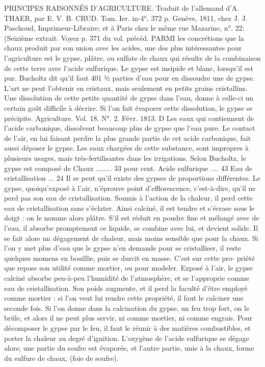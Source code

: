 \setcounter{page}{41} PRINCIPES RAISONNÉS D'AGRICULTURE. Traduit de l'allemand d'A. THAER, par E. V. B. CRUD. Tom. Ier. in-4°, 372 p. Genève, 1811, chez J. J. Paschoud, Imprimeur-Libraire; et à Paris chez le même rue Mazarine, n°. 22: (Seizième extrait. Voyez p. 371 du vol. précéd.
PARMI les concrétions que la chaux produit par son union avec les acides, une des plus intéressantes pour l'agriculture est le gypse, plâtre, ou sulfate de chaux qui résulte de la combinaison de cette terre avec l'acide sulfurique. Le gypse est insipide et blanc, lorsqu'il est pur. Bucholtz dit qu'il faut 401 ½ parties d'eau pour en dissoudre une de gypse. L'art ne peut l'obtenir en cristaux, mais seulement en petits grains cristallins.
Une dissolution de cette petite quantité de gypse dans l'eau, donne à celle-ci un certain goût difficile à décrire. Si l'on fait évaporer cette dissolution, le gypse se précipite.
Agriculture. Vol. 18. N°. 2. Févr. 1813. D\setcounter{page}{42} Les eaux qui contiennent de l'acide carbonique, dissolvent beaucoup plus de gypse que l'eau pure. Le contact de l'air, en lui faisant perdre la plus grande partie de cet acide carbonique, fait aussi déposer le gypse. Les eaux chargées de cette substance, sont impropres à plusieurs usages, mais très-fertilisantes dans les irrigations.
Selon Bucholtz, le gypse est composé de
Chaux ........ 33 pour cent.
Acide sulfurique .... 43
Eau de cristallisation ... 24
Il se peut qu'il existe des gypses de proportions différentes.
Le gypse, quoiqu'exposé à l'air, n'éprouve point d'efflorescence, c'est-à-dire, qu'il ne perd pas son eau de cristallisation. Soumis à l'action de la chaleur, il perd cette eau de cristallisation sans s'éclater. Ainsi calciné, il est tendre et s'écrase sous le doigt : on le nomme alors plâtre. S'il est réduit en poudre fine et mélangé avec de l'eau, il absorbe promptement ce liquide, se combine avec lui, et devient solide. Il se fait alors un dégagement de chaleur, mais moins sensible que pour la chaux. Si l'on y met plus d'eau que le gypse n'en demande pour se cristalliser, il reste quelques momens en bouillie, puis se durcit en masse. C'est sur cette pro-\setcounter{page}{43} priété que repose son utilité comme mortier, ou pour modeler.
Exposé à l'air, le gypse calciné absorbe peu-à-peu l'humidité de l'atmosphère, et se l'approprie comme eau de cristallisation. Son poids augmente, et il perd la faculté d'être employé comme mortier : si l'on veut lui rendre cette propriété, il faut le calciner une seconde fois.
Si l'on donne dans la calcination du gypse, un feu trop fort, on le brûle, et alors il ne peut plus servir, ni comme mortier, ni comme engrais. Pour décomposer le gypse par le feu, il faut le réunir à des matières combustibles, et porter la chaleur au degré d'ignition. L'oxygène de l'acide sulfurique se dégage alors; une partie du soufre est évaporée, et l'autre partie, unie à la chaux, forme du sulfure de chaux, (foie de soufre).
